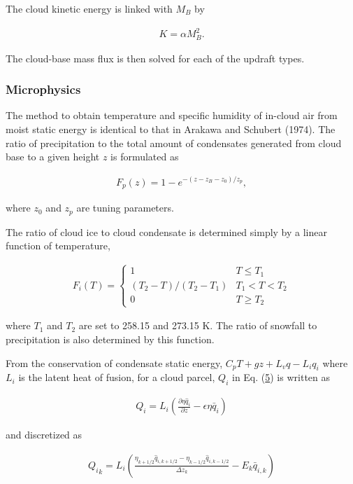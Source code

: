 The cloud kinetic energy is linked with \(M_B\) by

\begin{eqnarray}
 K = \alpha M_B^2.  \label{p-cum.9}
\end{eqnarray}

The cloud-base mass flux is then solved for each of the updraft types.

\hypertarget{microphysics}{%
\subsubsection{Microphysics}\label{microphysics}}

The method to obtain temperature and specific humidity of in-cloud air
from moist static energy is identical to that in Arakawa and Schubert
(1974). The ratio of precipitation to the total amount of condensates
generated from cloud base to a given height \(z\) is formulated as

\begin{eqnarray}
 F_p(z) = 1 - e^{-(z - z_B - z_0)/z_p},
\end{eqnarray}

where \(z_0\) and \(z_p\) are tuning parameters.

The ratio of cloud ice to cloud condensate is determined simply by a
linear function of temperature,

\begin{eqnarray}
 F_i(T) = \begin{cases} 1 & T \leq T_1 \\ (T_2 - T)/(T_2 - T_1) & T_1 < T < T_2 \\ 0  & T \geq T_2 \end{cases}
\end{eqnarray}

where \(T_1\) and \(T_2\) are set to 258.15 and 273.15 K. The ratio of
snowfall to precipitation is also determined by this function.

From the conservation of condensate static energy,
\(C_p T + gz + L_v q - L_i q_i\) where \(L_i\) is the latent heat of
fusion, for a cloud parcel, \(Q_i\) in Eq. (\href{p-cum.5}{5}) is
written as

\begin{eqnarray}
 Q_i = L_i \left(\frac{\partial \eta \hat{q}_i}{\partial z} - \epsilon\eta\bar{q}_i\right)
\end{eqnarray}

and discretized as

\begin{eqnarray}
 {Q_i}_k = L_i \left(\frac{\eta_{k+1/2} \hat{q}_{i,k+1/2} - \eta_{k-1/2} \hat{q}_{i,k-1/2}}{\Delta z_k} - E_k \bar{q}_{i,k} \right)
\end{eqnarray}

